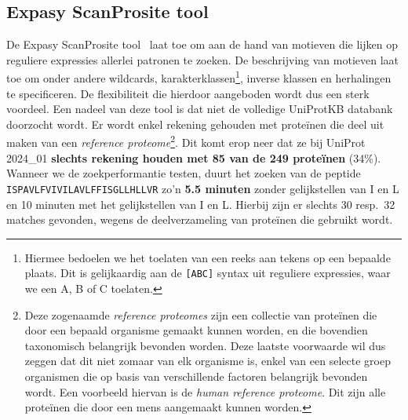 \subsection{Expasy ScanProsite tool}
De Expasy ScanProsite tool~\cite{scanprosite} laat toe om aan de hand van motieven die lijken op reguliere expressies allerlei patronen te zoeken.
De beschrijving van motieven laat toe om onder andere wildcards, karakterklassen\footnote{Hiermee bedoelen we het toelaten van een reeks aan tekens op een bepaalde plaats. Dit is gelijkaardig aan de \texttt{[ABC]} syntax uit reguliere expressies, waar we een A, B of C toelaten.}, inverse klassen en herhalingen te specificeren.
De flexibiliteit die hierdoor aangeboden wordt dus een sterk voordeel.
Een nadeel van deze tool is dat niet de volledige UniProtKB databank doorzocht wordt.
Er wordt enkel rekening gehouden met proteïnen die deel uit maken van een \textit{reference proteome}\footnote{Deze zogenaamde \textit{reference proteomes} zijn een collectie van proteïnen die door een bepaald organisme gemaakt kunnen worden, en die bovendien taxonomisch belangrijk bevonden worden. Deze laatste voorwaarde wil dus zeggen dat dit niet zomaar van elk organisme is, enkel van een selecte groep organismen die op basis van verschillende factoren belangrijk bevonden wordt. Een voorbeeld hiervan is de \textit{human reference proteome}. Dit zijn alle proteïnen die door een mens aangemaakt kunnen worden.}.
Dit komt erop neer dat ze bij UniProt 2024\_01 \textbf{slechts rekening houden met 85 van de 249 proteïnen} (34\%).
Wanneer we de zoekperformantie testen, duurt het zoeken van de peptide \texttt{ISPAVLFVIVILAVLFFISGLLHLLVR} zo'n \textbf{5.5 minuten} zonder gelijkstellen van I en L en 10 minuten met het gelijkstellen van I en L\@.
Hierbij zijn er slechts 30 resp.~32 matches gevonden, wegens de deelverzameling van proteïnen die gebruikt wordt.

